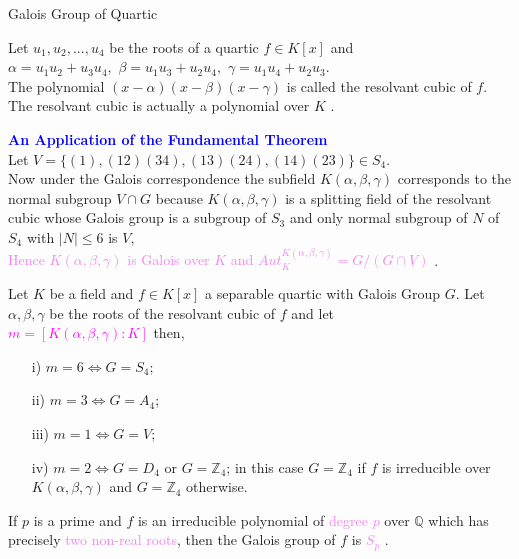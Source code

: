 \documentclass{beamer}
\begin{document}
\begin{frame}{Galois Group of Quartic}
  \begin{definition}
Let \(u_1,u_2,...,u_4\) be the roots of a quartic \(f \in K[x]\) and\\ \(\alpha=u_1u_2+u_3u_4,\) \(\beta=u_1u_3+u_2u_4,\) \(\gamma=u_1u_4+u_2u_3\). \\[3mm]
\textcolor{green!50!black}{The polynomial \( (x- \alpha)(x- \beta)(x- \gamma) \)} is called the resolvant cubic of \(f\). The resolvant cubic is actually a polynomial over \(K\) \cite{hunger}.
\end{definition}
\vspace{2mm}
\textbf{\textcolor{blue}{An Application of the Fundamental Theorem}} \\[3mm]
Let \(V=\{(1),(12)(34),(13)(24),(14)(23)\} \in S_4\).\\
Now under \textcolor{green!50!black}{the Galois correspondence the subfield \(K(\alpha, \beta, \gamma)\) corresponds to the normal subgroup \(V \cap G\)} \cite{hunger} because \(K(\alpha,\beta,\gamma)\) is a splitting field of the resolvant cubic
whose Galois group is a subgroup of \(S_3\) and only normal subgroup of \(N\) of \(S_4\) with \(|N| \leq 6\) is \(V\),\\[2mm]
\textcolor{violet}{Hence \(K(\alpha, \beta, \gamma)\) is Galois over \(K\) and \(Aut_K^{K(\alpha, \beta, \gamma)} = G/(G \cap V)\) \cite{hunger}}.
\end{frame}

\begin{frame}
  \begin{tcolorbox}[colback=white, colframe=blue!40, boxsep=0mm]
\begin{theorem}[Theorem]
  Let \(K\) be a field and \(f \in K[x]\) a separable quartic with Galois Group \(G\). Let \(\alpha, \beta, \gamma\) be the roots of the resolvant cubic of \(f\) and let\\
  \textcolor{magenta}{\(m= [K(\alpha, \beta, \gamma) : K]\)} then,
\begin{enumerate}
\item[i)] \(m=6 \Longleftrightarrow G=S_4\);
\item[ii)] \(m=3 \Longleftrightarrow G=A_4\);
\item[iii)] \(m=1 \Longleftrightarrow G=V\);
\item[iv)] \(m=2 \Longleftrightarrow G=D_4\) or \(G={\mathbb{Z}}_4\); in this case \(G={\mathbb{Z}}_4\) if \(f\) is irreducible over \(K(\alpha, \beta, \gamma)\) and \(G={\mathbb{Z}}_4\) otherwise\cite{hunger}.
\end{enumerate}
\end{theorem}
\end{tcolorbox}
\vspace{2mm}

\begin{theorem}[Theorem]
If \(p\) is a prime and \(f\) is an irreducible polynomial of \textcolor{violet}{degree \(p\)} over \(\mathbb{Q}\) which has precisely \textcolor{violet}{two non-real roots}, then the Galois group of \(f\) is \textcolor{violet}{\(S_p\)} \cite{hunger}.
\end{theorem}
\end{frame}
\end{document}
